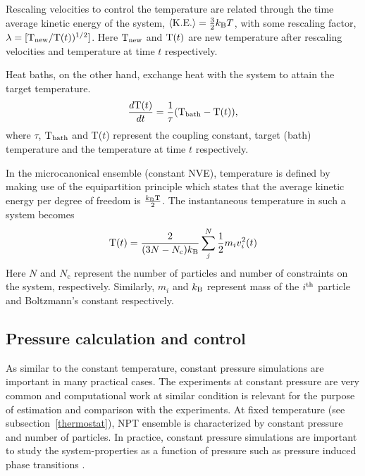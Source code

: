 Rescaling velocities to control the temperature are related through the time average kinetic energy of the system, $\left\langle \text{K.E.} \right\rangle = \frac{3}{2} k_{\rm B}T$, with some rescaling factor, $\lambda = [ {\rm T}_{\rm new}/{\rm T}(t) )^{1/2}]$. Here ${\rm T}_{\rm new} $ and $ {\rm T}(t) $ are new temperature after rescaling velocities and temperature at time $ t $ respectively.

Heat baths, on the other hand, exchange heat with the system to attain the target temperature.  
\begin{equation}\label{thermo}
\frac{d{\rm T}(t)}{dt}  =  \frac{1}{\tau} ( {\rm T}_{\rm bath} - {\rm T}(t)),
\end{equation}
where $\tau$, ${\rm T}_{\rm bath}$ and T($t$) represent the coupling constant, target (bath) temperature and the temperature at time $t$ respectively.

In the microcanonical ensemble (constant NVE), temperature is defined by making use of the equipartition principle which states that the average kinetic energy per degree of freedom is $\frac{k_{\rm B}{\rm T}}{2}$. The instantaneous temperature in such a system becomes  
\begin{equation}
{\rm T}(t) = \frac{2}{(3N - N_{\text{c}})k_{\rm B}}\sum_j^N\frac{1}{2}m_iv_i^2(t)
\end{equation}
Here ${N}$ and ${N}_{\text{c}}$ represent the number of particles and number of constraints on the system, respectively. Similarly, $m_i$ and $k_{\rm B}$ represent mass of the $i^{\rm th}$ particle and Boltzmann's constant respectively.
\subsection{Pressure calculation and control}
As similar to the constant temperature, constant pressure simulations are important in many practical cases. The experiments at constant pressure are very common and computational work at similar condition is relevant for the purpose of estimation and comparison with the experiments. At fixed temperature (see subsection~\ref{thermostat}), NPT ensemble is characterized by constant pressure and number of particles. In practice, constant pressure simulations are  important to study the system-properties as a function of pressure such as pressure induced phase transitions \citep{Leach2001}. 

